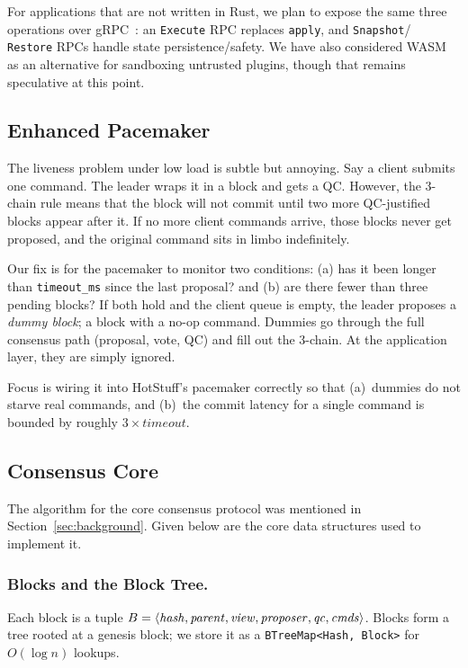 \documentclass{SVProc}
\begin{document}
For applications that are not written in Rust, we plan to expose the same three operations over gRPC~\cite{grpc}: an \texttt{Execute} RPC replaces \texttt{apply}, and \texttt{Snapshot}/\\\texttt{Restore} RPCs handle state persistence/safety.  We have also considered WASM as an alternative
for sandboxing untrusted plugins, though that remains speculative at this point.

\subsection{Enhanced Pacemaker}
\label{sec:pacemaker}

The liveness problem under low load is subtle but annoying. Say a client submits one command. The leader wraps it in a block and gets a QC. However, the 3-chain rule means that the block will not commit until two more QC-justified blocks appear after it.  If no more client commands arrive, those blocks never get proposed, and the original command sits in limbo indefinitely.

Our fix is for the pacemaker to monitor two conditions: (a) has it been longer than \texttt{timeout\_ms} since the last proposal? and (b) are there fewer than three pending blocks?  If both hold and the client queue is empty, the leader proposes a \emph{dummy block}; a block with a no-op command.  Dummies go through the full consensus path (proposal, vote, QC) and fill out the 3-chain. At the application layer, they are
simply ignored.

Focus is wiring it into HotStuff's pacemaker correctly so that (a)~dummies do not starve real commands, and (b)~the commit latency for a single command is bounded by roughly $3 \times \textit{timeout}$.

\subsection{Consensus Core}

The algorithm for the core consensus protocol was mentioned in Section~\ref{sec:background}. Given below are the core data structures used to implement it.
\subsubsection{Blocks and the Block Tree.}
Each block is a tuple $B = \langle \mathit{hash}, \mathit{parent}, \mathit{view}, \\ \mathit{proposer}, \mathit{qc}, \mathit{cmds} \rangle$.
Blocks form a tree rooted at a genesis block; we store it as a
\texttt{BTreeMap<Hash, Block>} for $O(\log n)$ lookups.
\end{document}
